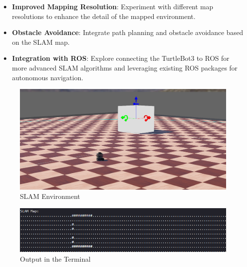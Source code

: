 \begin{itemize}
    \item \textbf{Improved Mapping Resolution}: Experiment with different map resolutions to enhance the detail of the mapped environment.
    \item \textbf{Obstacle Avoidance}: Integrate path planning and obstacle avoidance based on the SLAM map.
    \item \textbf{Integration with ROS}: Explore connecting the TurtleBot3 to ROS for more advanced SLAM algorithms and leveraging existing ROS packages for autonomous navigation.
\end{itemize}

\begin{figure}
    \centering
    \includegraphics[width=1\linewidth]{assets/images/slam/environment.png}
    \caption{SLAM Environment}
    \label{fig:slam_environment}
\end{figure}

\begin{figure}
    \centering
    \includegraphics[width=1\linewidth]{assets/images/slam/output.png}
    \caption{Output in the Terminal}
    \label{fig:slam_output}
\end{figure}
